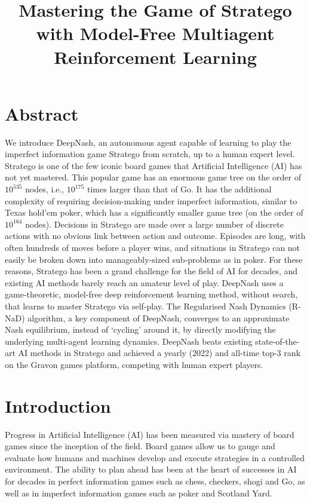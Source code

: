 \title{Mastering the Game of Stratego with Model-Free Multiagent Reinforcement Learning}

\section*{Abstract}
We introduce DeepNash, an autonomous agent capable of learning to play the imperfect information game Stratego from scratch, up to a human expert level. Stratego is one of the few iconic board games that Artificial Intelligence (AI) has not yet mastered. This popular game has an enormous game tree on the order of $10^{535}$ nodes, i.e., $10^{175}$ times larger than that of Go. It has the additional complexity of requiring decision-making under imperfect information, similar to Texas hold'em poker, which has a significantly smaller game tree (on the order of $10^{164}$ nodes). Decisions in Stratego are made over a large number of discrete actions with no obvious link between action and outcome. Episodes are long, with often hundreds of moves before a player wins, and situations in Stratego can not easily be broken down into manageably-sized sub-problems as in poker. For these reasons, Stratego has been a grand challenge for the field of AI for decades, and existing AI methods barely reach an amateur level of play. DeepNash uses a game-theoretic, model-free deep reinforcement learning method, without search, that learns to master Stratego via self-play. The Regularised Nash Dynamics (R-NaD) algorithm, a key component of DeepNash, converges to an approximate Nash equilibrium, instead of `cycling' around it, by directly modifying the underlying multi-agent learning dynamics. DeepNash beats existing state-of-the-art AI methods in Stratego and achieved a yearly (2022) and all-time top-3 rank on the Gravon games platform, competing with human expert players.

\section{Introduction}
Progress in Artificial Intelligence (AI) has been measured via mastery of board games since the inception of the field. Board games allow us to gauge and evaluate how humans and machines develop and execute strategies in a controlled environment. The ability to plan ahead has been at the heart of successes in AI for decades in perfect information games such as chess, checkers, shogi and Go, as well as in imperfect information games such as poker and Scotland Yard.

